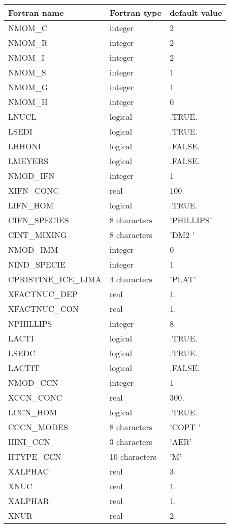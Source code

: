 \begin{longtable} {|p{}|p{}|p{}|}
\hline
Fortran name &  Fortran type & default value \\
\hline
\endhead
\hline
\endfoot
NMOM\_C & integer & 2 \\
NMOM\_R & integer & 2 \\
NMOM\_I & integer & 2 \\
NMOM\_S & integer & 1 \\
NMOM\_G & integer & 1 \\
NMOM\_H & integer & 0 \\
LNUCL & logical	  &  .TRUE. \\
LSEDI &  logical&  .TRUE. \\
LHHONI & logical &  .FALSE.\\
LMEYERS & logical   & .FALSE. \\
NMOD\_IFN & integer   & 1  \\
XIFN\_CONC & real & 100.  \\
LIFN\_HOM & logical & .TRUE.  \\
CIFN\_SPECIES & 8 characters   & 'PHILLIPS' \\
CINT\_MIXING &8 characters  & 'DM2     ' \\
NMOD\_IMM & integer &0  \\
NIND\_SPECIE & integer & 1 \\
CPRISTINE\_ICE\_LIMA & 4 characters &  'PLAT' \\
XFACTNUC\_DEP & real  & 1. \\
XFACTNUC\_CON & real & 1. \\
NPHILLIPS & integer  & 8 \\
LACTI& logical  & .TRUE. \\
LSEDC& logical  & .TRUE. \\
LACTIT& logical  & .FALSE. \\
NMOD\_CCN & integer   & 1  \\
XCCN\_CONC & real & 300.  \\
LCCN\_HOM & logical & .TRUE.  \\
CCCN\_MODES &  8 characters & 'COPT    '  \\
HINI\_CCN & 3 characters  & 'AER' \\
HTYPE\_CCN & 10 characters & 'M'  \\
XALPHAC & real & 3.  \\
XNUC & real  & 1.  \\
XALPHAR &  real& 1. \\
XNUR & real  & 2. \\

\end{longtable}
